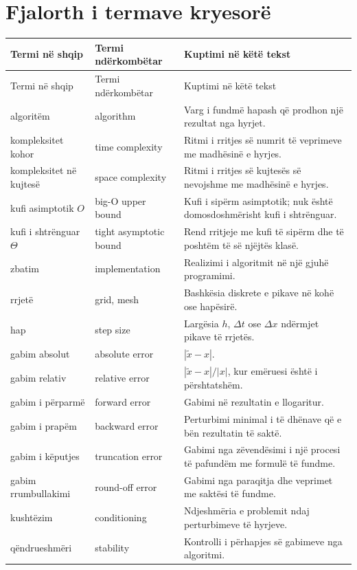 \documentclass[11pt,oneside,openany]{book}
\begin{document}
\section{Fjalorth i termave kryesorë}
\small
\begin{longtable}{p{}p{}p{}}
\toprule
Termi në shqip & Termi ndërkombëtar & Kuptimi në këtë tekst\\ \midrule
\endfirsthead
\toprule
Termi në shqip & Termi ndërkombëtar & Kuptimi në këtë tekst\\ \midrule
\endhead
algoritëm & algorithm & Varg i fundmë hapash që prodhon një rezultat nga hyrjet.\\
kompleksitet kohor & time complexity & Ritmi i rritjes së numrit të veprimeve me madhësinë e hyrjes.\\
kompleksitet në kujtesë & space complexity & Ritmi i rritjes së kujtesës së nevojshme me madhësinë e hyrjes.\\
kufi asimptotik $O$ & big-O upper bound & Kufi i sipërm asimptotik; nuk është domosdoshmërisht kufi i shtrënguar.\\
kufi i shtrënguar $\Theta$ & tight asymptotic bound & Rend rritjeje me kufi të sipërm dhe të poshtëm të së njëjtës klasë.\\
zbatim & implementation & Realizimi i algoritmit në një gjuhë programimi.\\
rrjetë & grid, mesh & Bashkësia diskrete e pikave në kohë ose hapësirë.\\
hap & step size & Largësia $h$, $\Delta t$ ose $\Delta x$ ndërmjet pikave të rrjetës.\\
gabim absolut & absolute error & $|\tilde x-x|$.\\
gabim relativ & relative error & $|\tilde x-x|/|x|$, kur emëruesi është i përshtatshëm.\\
gabim i përparmë & forward error & Gabimi në rezultatin e llogaritur.\\
gabim i prapëm & backward error & Perturbimi minimal i të dhënave që e bën rezultatin të saktë.\\
gabim i këputjes & truncation error & Gabimi nga zëvendësimi i një procesi të pafundëm me formulë të fundme.\\
gabim rrumbullakimi & round-off error & Gabimi nga paraqitja dhe veprimet me saktësi të fundme.\\
kushtëzim & conditioning & Ndjeshmëria e problemit ndaj perturbimeve të hyrjeve.\\
qëndrueshmëri & stability & Kontrolli i përhapjes së gabimeve nga algoritmi.\\

\end{longtable}
\end{document}
